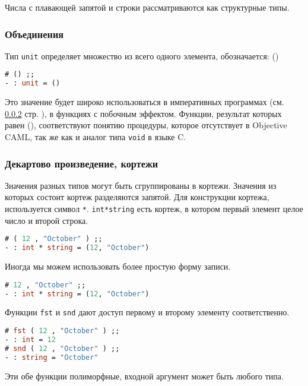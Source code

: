 Числа с плавающей запятой и строки рассматриваются как структурные типы.

\subsubsection{Объединения}

Тип \texttt{unit} определяет множество из всего одного элемента, обозначается:
()

\begin{lstlisting}[language=OCaml]
# () ;;
- : unit = ()
\end{lstlisting}

Это значение будет широко использоваться в императивных программах (см. \ref{}
стр. \pageref{}), в функциях с побочным эффектом. Функции, результат которых
равен (), соответствуют понятию процедуры, которое отсутствует в Objective CAML,
так же как и аналог типа \texttt{void} в языке C.

\subsubsection{Декартово произведение, кортежи}

Значения разных типов могут быть сгруппированы в кортежи. Значения из которых
состоит кортеж разделяются запятой. Для конструкции кортежа, используется символ
\texttt{*}. \texttt{int*string} есть кортеж, в котором первый элемент целое
число и второй строка.

\begin{lstlisting}[language=OCaml]
# ( 12 , "October" ) ;;
- : int * string = (12, "October")
\end{lstlisting}

Иногда мы можем использовать более простую форму записи.

\begin{lstlisting}[language=OCaml]
# 12 , "October" ;;
- : int * string = (12, "October")
\end{lstlisting}

Функции \texttt{fst} и \texttt{snd} дают доступ первому и второму элементу
соответственно.

\begin{lstlisting}[language=OCaml]
# fst ( 12 , "October" ) ;;
- : int = 12
# snd ( 12 , "October" ) ;;
- : string = "October"
\end{lstlisting}

Эти обе функции полиморфные, входной аргумент может быть любого типа.

